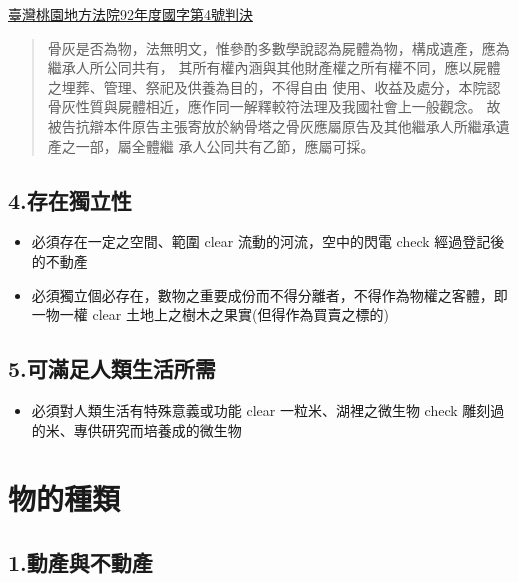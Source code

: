 \documentclass[
]{book}
\providecommand{\tightlist}{%
  \setlength{\itemsep}{0pt}\setlength{\parskip}{0pt}}
\begin{document}
\href{\%22https://tyd.judicial.gov.tw\%22}{臺灣桃園地方法院92年度國字第4號判決}

\begin{quote}
骨灰是否為物，法無明文，惟參酌多數學說認為屍體為物，構成遺產，應為繼承人所公同共有， 其所有權內涵與其他財產權之所有權不同，應以屍體之埋葬、管理、祭祀及供養為目的，不得自由 使用、收益及處分，本院認骨灰性質與屍體相近，應作同一解釋較符法理及我國社會上一般觀念。 故被告抗辯本件原告主張寄放於納骨塔之骨灰應屬原告及其他繼承人所繼承遺產之一部，屬全體繼 承人公同共有乙節，應屬可採。
\end{quote}

\hypertarget{ux5b58ux5728ux7368ux7acbux6027}{%
\subsection{4.存在獨立性}\label{ux5b58ux5728ux7368ux7acbux6027}}

\begin{itemize}
\item
  必須存在一定之空間、範圍
  clear
  流動的河流，空中的閃電
  check
  經過登記後的不動產
\item
  必須獨立個必存在，數物之重要成份而不得分離者，不得作為物權之客體，即一物一權
  clear
  土地上之樹木之果實(但得作為買賣之標的)
\end{itemize}

\hypertarget{ux53efux6effux8db3ux4ebaux985eux751fux6d3bux6240ux9700}{%
\subsection{5.可滿足人類生活所需}\label{ux53efux6effux8db3ux4ebaux985eux751fux6d3bux6240ux9700}}

\begin{itemize}
\tightlist
\item
  必須對人類生活有特殊意義或功能
  clear
  一粒米、湖裡之微生物
  check
  雕刻過的米、專供研究而培養成的微生物
\end{itemize}

\pagebreak

\hypertarget{ux7269ux7684ux7a2eux985e}{%
\section{物的種類}\label{ux7269ux7684ux7a2eux985e}}

\hypertarget{ux52d5ux7522ux8207ux4e0dux52d5ux7522}{%
\subsection{1.動產與不動產}\label{ux52d5ux7522ux8207ux4e0dux52d5ux7522}}
\end{document}
